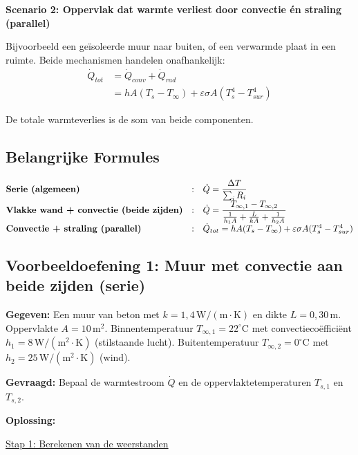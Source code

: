 \documentclass[a4paper,11pt,twoside]{report}
\newcommand{\term}[1]{\textbf{#1}}
\begin{document}
\textbf{Scenario 2: Oppervlak dat warmte verliest door convectie én straling (parallel)}

Bijvoorbeeld een geïsoleerde muur naar buiten, of een verwarmde plaat in een ruimte. Beide mechanismen handelen onafhankelijk:
\begin{align}
\dot{Q}_{tot} &= \dot{Q}_{conv} + \dot{Q}_{rad}\\
&= h A (T_s - T_\infty) + \varepsilon \sigma A (T_s^4 - T_{sur}^4)
\end{align}

De totale warmteverlies is de som van beide componenten.

\subsection*{Belangrijke Formules}

\begingroup
\setlength{\tabcolsep}{6pt}
\renewcommand{\arraystretch}{1.35}
\[
\begin{array}{@{}lcl@{}}
            	\textbf{Serie (algemeen)} &:& \dot{Q}=\dfrac{\Delta T}{\sum_i R_i}\\
            	\term{Vlakke wand + convectie (beide zijden)} &:& \dot{Q}=\dfrac{T_{\infty,1}-T_{\infty,2}}{\frac{1}{h_1A}+\frac{L}{kA}+\frac{1}{h_2A}}\\
            	\textbf{Convectie + straling (parallel)} &:& \dot{Q}_{tot}=hA(T_s-T_\infty)+\varepsilon\sigma A(T_s^4-T_{sur}^4)\\
\end{array}
\]
\endgroup

\subsection*{Voorbeeldoefening 1: Muur met convectie aan beide zijden (serie)}

\textbf{Gegeven:} 
Een muur van beton met $k=1{,}4\,\mathrm{W/(m\cdot K)}$ en dikte $L=0{,}30\,\mathrm{m}$. 
Oppervlakte $A=10\,\mathrm{m^2}$. 
Binnentemperatuur $T_{\infty,1}=22^\circ\mathrm{C}$ met convectiecoëfficiënt $h_1=8\,\mathrm{W/(m^2\cdot K)}$ (stilstaande lucht).
Buitentemperatuur $T_{\infty,2}=0^\circ\mathrm{C}$ met $h_2=25\,\mathrm{W/(m^2\cdot K)}$ (wind).

\textbf{Gevraagd:} Bepaal de warmtestroom $\dot{Q}$ en de oppervlaktetemperaturen $T_{s,1}$ en $T_{s,2}$.

\textbf{Oplossing:}

\underline{Stap 1: Berekenen van de weerstanden}
\end{document}

